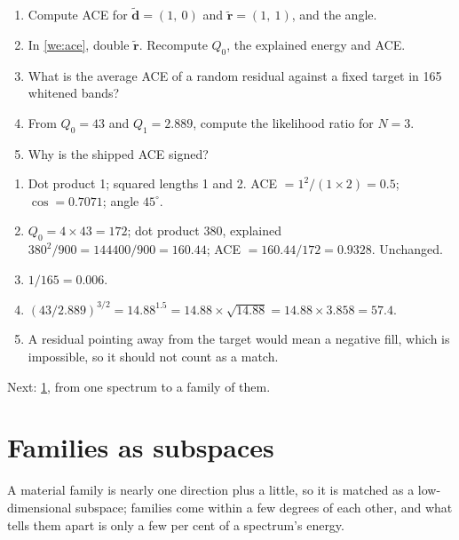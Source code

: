 \documentclass[11pt,a4paper,oneside,openany]{book}
\newcommand{\B}[1]{{\symbf{#1}}}
\newcommand{\B}[1]{{\bm{#1}}}
\newcommand{\vr}{\B{r}}
\newcommand{\vd}{\B{d}}
\newcommand{\nextchapter}[1]{\par\medskip\noindent\hfill\textsf{\small Next: #1}\par}
\begin{document}
\begin{checkyourself}
\begin{enumerate}
\item Compute ACE for $\tilde{\vd}=(1,\ 0)$ and $\tilde{\vr}=(1,\ 1)$, and the angle.
\item In \cref{we:ace}, double $\tilde{\vr}$. Recompute $Q_0$, the explained energy and ACE.
\item What is the average ACE of a random residual against a fixed target in 165 whitened bands?
\item From $Q_0=43$ and $Q_1=2.889$, compute the likelihood ratio for $N=3$.
\item Why is the shipped ACE signed?
\end{enumerate}
\end{checkyourself}

\begin{answers}
\begin{enumerate}
\item Dot product 1; squared lengths 1 and 2. ACE $=1^2/(1\times2)=0.5$; $\cos=0.7071$; angle $45^\circ$.
\item $Q_0=4\times43=172$; dot product $380$, explained $380^2/900=144400/900=160.44$; ACE $=160.44/172=0.9328$. Unchanged.
\item $1/165=0.006$.
\item $(43/2.889)^{3/2}=14.88^{1.5}=14.88\times\sqrt{14.88}=14.88\times3.858=57.4$.
\item A residual pointing away from the target would mean a negative fill, which is impossible, so it should not count as a match.
\end{enumerate}
\end{answers}

\nextchapter{\cref{ch:families}, from one spectrum to a family of them.}
\chapter{Families as subspaces}
\label{ch:families}

\begin{onething}
A material family is nearly one direction plus a little, so it is matched as a low-dimensional subspace; families come within a few degrees of
each other, and what tells them apart is only a few per cent of a spectrum's energy.
\end{onething}
\end{document}
